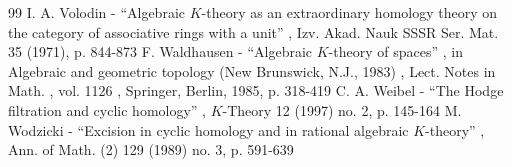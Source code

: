 \documentclass[11pt]{article}
\begin{document}
\begin{thebibliography}{99}
 I. A. Volodin - “Algebraic $K$-theory as an extraordinary homology theory on the category of associative rings with a unit” , Izv. Akad. Nauk SSSR Ser. Mat. 35 (1971), p. 844-873
 F. Waldhausen - “Algebraic $K$-theory of spaces” , in Algebraic and geometric topology (New Brunswick, N.J., 1983) , Lect. Notes in Math. , vol. 1126 , Springer, Berlin, 1985, p. 318-419
 C. A. Weibel - “The Hodge filtration and cyclic homology” , $K$-Theory 12 (1997) no. 2, p. 145-164
 M. Wodzicki - “Excision in cyclic homology and in rational algebraic $K$-theory” , Ann. of Math. (2) 129 (1989) no. 3, p. 591-639
\end{thebibliography}
\end{document}
